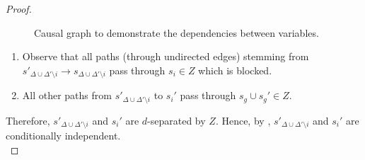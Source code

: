 \documentclass{article}
\theoremstyle{plain}
\theoremstyle{definition}
\begin{document}
\begin{proof}
\begin{figure}[hbt!]
\begin{center}
\end{center}
\caption{Causal graph to demonstrate the dependencies between variables.}
\end{figure}
\begin{enumerate}
    \item Observe that all paths (through undirected edges) stemming from $s'_{\Delta\cup\Delta'\setminus i}\to s_{\Delta\cup\Delta'\setminus i}$ pass through $s_i \in Z$ which is blocked.
    \item All other paths from $s'_{\Delta\cup\Delta'\setminus i}$ to $s_i'$ pass through $s_g\cup s_g' \in Z$. 
\end{enumerate}
  Therefore, $s'_{\Delta\cup\Delta'\setminus i}$ and $s_i'$ are $d$-separated by $Z$. Hence, by \cite{shachter2013bayesball}, $s'_{\Delta\cup\Delta'\setminus i}$ and $s_i'$ are conditionally independent.\qedhere \\
\end{proof}
\end{document}
